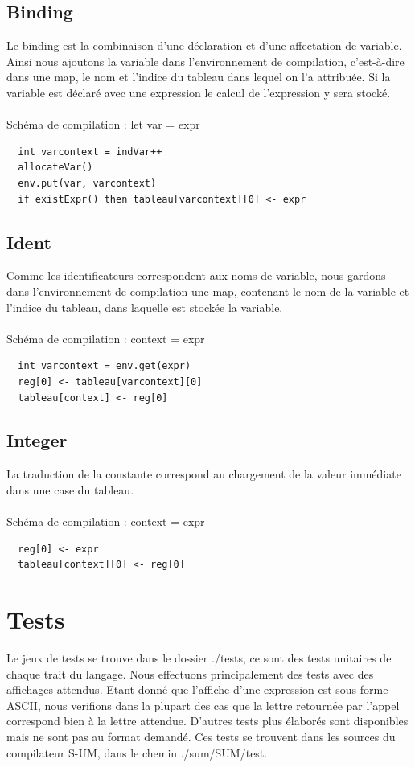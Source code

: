 \documentclass[a4paper,12pt]{report}
\begin{document}
\subsection{Binding}
Le binding est la combinaison d'une déclaration et d'une affectation de variable. Ainsi nous ajoutons la variable dans l'environnement de compilation, c'est-à-dire dans une map, le nom et l'indice
du tableau dans lequel on l'a attribuée. Si la variable est déclaré avec une expression le calcul de l'expression y sera stocké.
\\ \\
Schéma de compilation : let var = expr
\begin{verbatim}
  int varcontext = indVar++
  allocateVar()
  env.put(var, varcontext)
  if existExpr() then tableau[varcontext][0] <- expr
\end{verbatim}

\subsection{Ident}
Comme les identificateurs correspondent aux noms de variable, nous gardons dans l'environnement de compilation une map, contenant le nom de la variable
et l'indice du tableau, dans laquelle est stockée la variable.
\\ \\
Schéma de compilation : context = expr
\begin{verbatim}
  int varcontext = env.get(expr)
  reg[0] <- tableau[varcontext][0]
  tableau[context] <- reg[0]
\end{verbatim}


\subsection{Integer}
La traduction de la constante correspond au chargement de la valeur immédiate dans une case du tableau.
\\ \\
Schéma de compilation : context = expr
\begin{verbatim}
  reg[0] <- expr
  tableau[context][0] <- reg[0]
\end{verbatim}

\section{Tests}
Le jeux de tests se trouve dans le dossier ./tests, ce sont des tests unitaires de chaque trait du langage.
Nous effectuons principalement des tests avec des affichages attendus. Etant donné que l'affiche d'une expression est sous forme ASCII,
nous verifions dans la plupart des cas que la lettre retournée par l'appel correspond bien à la lettre attendue.
D'autres tests plus élaborés sont disponibles mais ne sont pas au format demandé. Ces tests se trouvent dans les sources 
du compilateur S-UM, dans le chemin ./sum/SUM/test.
\end{document}
